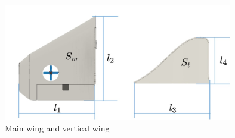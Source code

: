 \begin{figure}[h]
	\begin{center}
		\includegraphics[clip,width = 10.0cm, bb=0 0 1000 511]{./z_figure_files/chapter2/10_Wings.jpeg}
		\caption{Main wing and vertical wing}
		\label{fig:wings}
	\end{center}
\end{figure}

